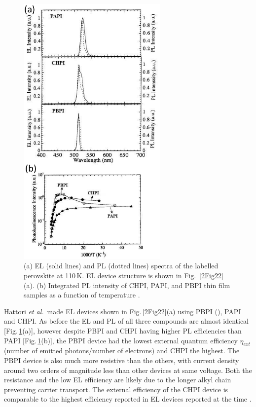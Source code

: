 \begin{figure}[h!]
\centering
\includegraphics[width=0.65\textwidth]{Fig23}
\caption{(a) EL (solid lines) and PL (dotted lines) spectra of the labelled perovskite at 110\,K. EL device structure is shown in Fig.\ \ref{2Fig22}(a). (b) Integrated PL intensity of CHPI, PAPI, and PBPI thin film samples as a function of temperature \cite{Hattori1996}.}
\label{2Fig23}
\end{figure}
Hattori \textit{et al.}\ made EL devices shown in Fig.\,\ref{2Fig22}(a) using PBPI (), PAPI and CHPI. As before the EL and PL of all three compounds are almost identical [Fig.\,\ref{2Fig23}(a)], however despite PBPI and CHPI having higher PL efficiencies than PAPI [Fig.\,\ref{2Fig23}(b)], the PBPI device had the lowest external quantum efficiency $\eta_{ext}$ (number of emitted photons/number of electrons) and CHPI the highest. The PBPI device is also much more resistive than the others, with current density around two orders of magnitude less than other devices at same voltage. Both the resistance and the low EL efficiency are likely due to the longer alkyl chain preventing carrier transport. The external efficiency of the CHPI device is comparable to the highest efficiency reported in EL devices reported at the time \cite{Hattori1996}.

